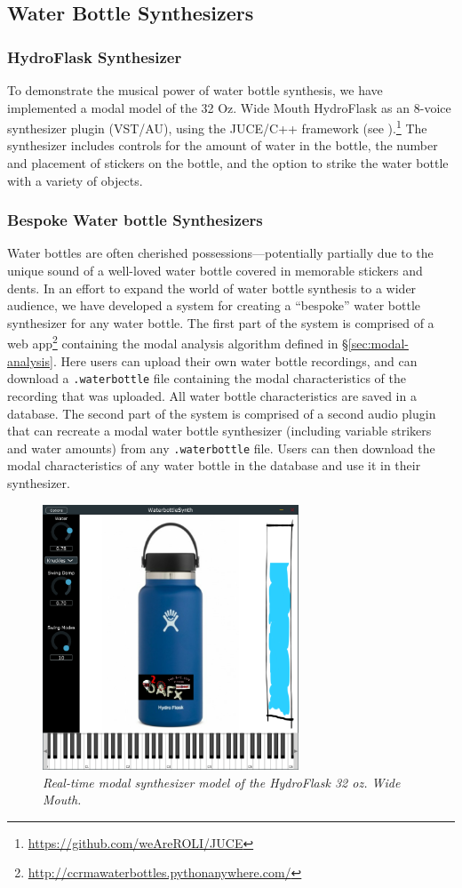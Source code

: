 \documentclass[twoside,a4paper]{article}
\begin{document}
%
\subsection{Water Bottle Synthesizers} \label{sec:synth}

\subsubsection{HydroFlask Synthesizer}
To demonstrate the musical power of water bottle synthesis, we have
implemented a modal model of the 32 Oz. Wide Mouth HydroFlask
as an 8-voice synthesizer plugin (VST/AU), using the JUCE/C++
framework (see ).\footnote{\url{https://github.com/weAreROLI/JUCE}}
The synthesizer includes controls for the amount of water in the bottle,
the number and placement of stickers on the bottle, and the option to
strike the water bottle with a variety of objects. 

\subsubsection{Bespoke Water bottle Synthesizers}
Water bottles are often cherished possessions---potentially partially due to the unique sound of a well-loved water bottle covered in memorable stickers and dents. In an effort to expand the world of water bottle synthesis to a wider
audience, we have developed a system for creating a ``bespoke''
water bottle synthesizer for any water bottle. The first part of the
system is comprised of a web app\footnote{\url{http://ccrmawaterbottles.pythonanywhere.com/}}
containing the modal analysis algorithm defined in \S\ref{sec:modal-analysis}. 
Here users can upload their own water bottle recordings, and can download a
\texttt{.waterbottle} file containing the modal characteristics of the
recording that was uploaded. All water bottle characteristics are saved in 
a database. The second part of the system is comprised of
a second audio plugin that can recreate a modal water bottle synthesizer
(including variable strikers and water amounts) from any \texttt{.waterbottle}
file. Users can then download the modal characteristics of any water
bottle in the database and use it in their synthesizer.
%
\begin{figure}
    \centering
    \includegraphics[width=3in]{../Figures/WaterbottleSynthPlugin.png}
    \caption{\it{Real-time modal synthesizer model of the HydroFlask
    32 oz. Wide Mouth.}}
    \label{fig:plugin}
\end{figure}
\end{document}
